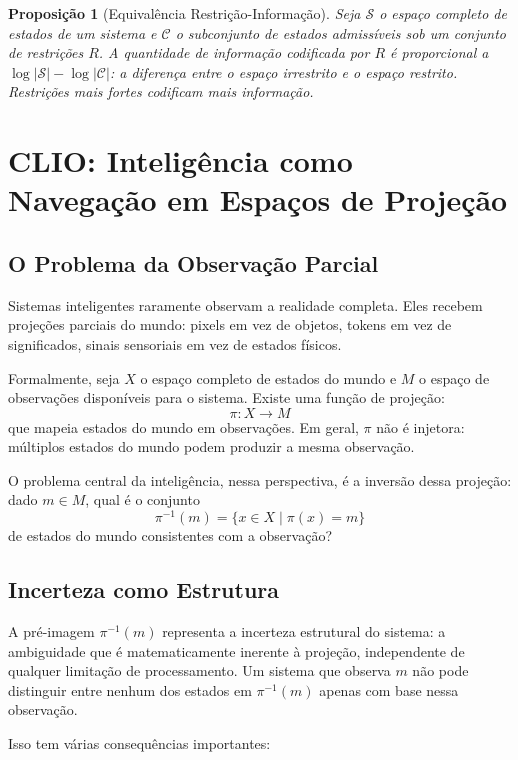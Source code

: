 \documentclass[11pt, a4paper]{article}
\theoremstyle{named}
\newtheorem{proposicao}{Proposição}
\begin{document}
\begin{proposicao}[Equivalência Restrição-Informação]
Seja $\mathcal{S}$ o espaço completo de estados de um sistema e
$\mathcal{C}$ o subconjunto de estados admissíveis sob um conjunto
de restrições $R$. A quantidade de informação codificada por $R$ é
proporcional a $\log |\mathcal{S}| - \log |\mathcal{C}|$: a diferença
entre o espaço irrestrito e o espaço restrito. Restrições mais fortes
codificam mais informação.
\end{proposicao}

\section{CLIO: Inteligência como Navegação em Espaços de Projeção}

\subsection{O Problema da Observação Parcial}

Sistemas inteligentes raramente observam a realidade completa. Eles
recebem projeções parciais do mundo: pixels em vez de objetos, tokens
em vez de significados, sinais sensoriais em vez de estados físicos.

Formalmente, seja $X$ o espaço completo de estados do mundo e $M$ o
espaço de observações disponíveis para o sistema. Existe uma função de
projeção:
\[
  \pi: X \rightarrow M
\]
que mapeia estados do mundo em observações. Em geral, $\pi$ não é
injetora: múltiplos estados do mundo podem produzir a mesma observação.

O problema central da inteligência, nessa perspectiva, é a inversão
dessa projeção: dado $m \in M$, qual é o conjunto
\[
  \pi^{-1}(m) = \{x \in X \mid \pi(x) = m\}
\]
de estados do mundo consistentes com a observação?

\subsection{Incerteza como Estrutura}

A pré-imagem $\pi^{-1}(m)$ representa a incerteza estrutural do sistema:
a ambiguidade que é matematicamente inerente à projeção, independente de
qualquer limitação de processamento. Um sistema que observa $m$ não pode
distinguir entre nenhum dos estados em $\pi^{-1}(m)$ apenas com base
nessa observação.

Isso tem várias consequências importantes:
\end{document}
